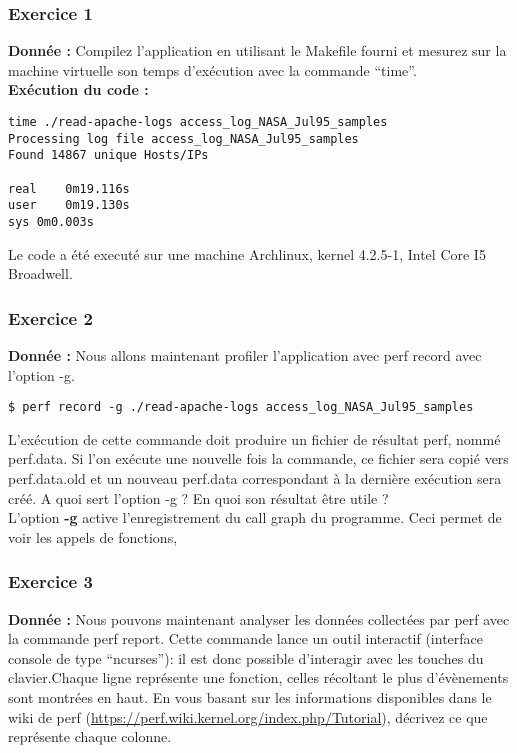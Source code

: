 \subsubsection{Exercice 1}
\textbf{Donnée : } Compilez	l'application	en	utilisant	le	Makefile	fourni	et	mesurez sur	la	machine	virtuelle son	temps	
d'exécution	avec	la	commande	“time”.\\

\textbf{Exécution du code : } \\
\begin{lstlisting}
time ./read-apache-logs access_log_NASA_Jul95_samples 
Processing log file access_log_NASA_Jul95_samples
Found 14867 unique Hosts/IPs

real	0m19.116s
user	0m19.130s
sys	0m0.003s
\end{lstlisting}
Le code a été executé sur une machine Archlinux, kernel 4.2.5-1, Intel Core I5 Broadwell.

\subsubsection{Exercice 2}
\textbf{Donnée : } Nous	allons	maintenant	profiler	l'application	avec	perf	record	avec	l'option	-g.
\begin{lstlisting}
$ perf record -g ./read-apache-logs access_log_NASA_Jul95_samples
\end{lstlisting}
L'exécution	de	cette	commande	doit	produire	un	fichier	de	résultat	perf,	nommé	perf.data.	Si	l'on	
exécute	une	nouvelle	fois	la	commande,	ce	fichier	sera	copié	vers	perf.data.old et	un	nouveau	
perf.data	correspondant	à	la	dernière	exécution	sera	créé.
A	quoi	sert	l'option	-g	?	En	quoi	son	résultat	être	utile	?\\

L'option \textbf{-g} active l'enregistrement du call graph du programme. Ceci permet de voir les appels de fonctions, 

\subsubsection{Exercice 3}
\textbf{Donnée : } Nous	pouvons	maintenant	analyser	les	données	collectées	par	perf	avec	la	commande	perf	report.	
Cette	commande	lance	un	outil	interactif	(interface	console de	type	“ncurses”):	il	est	donc	possible	
d'interagir avec	les	touches	du	clavier.Chaque	ligne	représente	une	fonction,	celles	récoltant	le	plus	d'évènements	sont	montrées	en	haut.	
En	vous	basant sur	les	informations	disponibles	dans	le	wiki	de	perf	
(\url{https://perf.wiki.kernel.org/index.php/Tutorial}),	décrivez	ce	que	représente	chaque	colonne.\\

